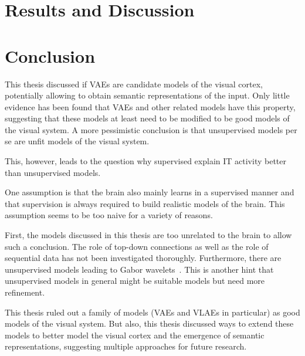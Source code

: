 \documentclass[11pt]{article}
\let\oldsection\section
\renewcommand\section{\clearpage\oldsection}
\newcounter{savepage}
\begin{document}
\section{Results and Discussion}\label{sec:results}


\acresetall
\section{Conclusion}\label{sec:conclusion}

This thesis discussed if \acfp{VAE} are candidate models of the visual cortex, potentially allowing to obtain semantic representations of the input.
Only little evidence has been found that \acp{VAE} and other related models have this property, suggesting that these models at least need to be modified to be good models of the visual system.
A more pessimistic conclusion is that unsupervised models per se are unfit models of the visual system.

This, however, leads to the question why supervised explain \ac{IT} activity better than unsupervised models.

One assumption is that the brain also mainly learns in a supervised manner and that supervision is always required to build realistic models of the brain.
This assumption seems to be too naive for a variety of reasons.

First, the models discussed in this thesis are too unrelated to the brain to allow such a conclusion.
The role of top-down connections as well as the role of sequential data has not been investigated thoroughly.
Furthermore, there are unsupervised models leading to Gabor wavelets~\citep{berkes2005slow}.
This is another hint that unsupervised models in general might be suitable models but need more refinement.

This thesis ruled out a family of models (\acp{VAE} and \acp{VLAE} in particular) as good models of the visual system.
But also, this thesis discussed ways to extend these models to better model the visual cortex and the emergence of semantic representations, suggesting multiple approaches for future research.

\newpage
\printbibliography

\newpage
{}
\setcounter{page}{\thesavepage}
\appendix
\end{document}

